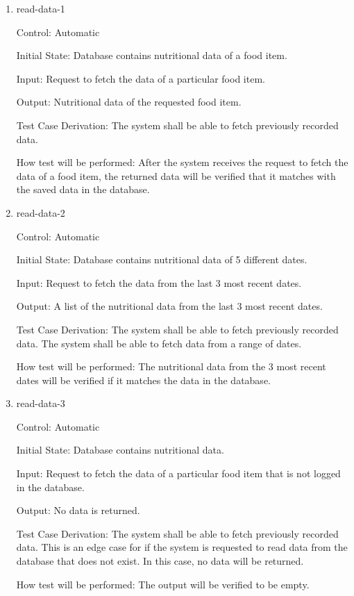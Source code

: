 \documentclass[12pt, titlepage]{article}
\begin{document}
	\begin{enumerate}
		
		\item{read-data-1\\}
		
		Control: Automatic
		
		Initial State: Database contains nutritional data of a food item.
		
		Input: Request to fetch the data of a particular food item.
		
		Output: Nutritional data of the requested food item.
		
		Test Case Derivation: The system shall be able to fetch previously recorded data.
		
		How test will be performed: After the system receives the request to fetch the data of a food item, the returned data will be verified that it matches with the saved data in the database.
		
		\item{read-data-2\\}
		
		Control: Automatic
		
		Initial State: Database contains nutritional data of 5 different dates.
		
		Input: Request to fetch the data from the last 3 most recent dates.
		
		Output: A list of the nutritional data from the last 3 most recent dates.
		
		Test Case Derivation: The system shall be able to fetch previously recorded data. The system shall be able to fetch data from a range of dates.
		
		How test will be performed: The nutritional data from the 3 most recent dates will be verified if it matches the data in the database.
		
		\item{read-data-3\\}
		
		Control: Automatic
		
		Initial State: Database contains nutritional data.
		
		Input: Request to fetch the data of a particular food item that is not logged in the database.
		
		Output: No data is returned.
		
		Test Case Derivation: The system shall be able to fetch previously recorded data. This is an edge case for if the system is requested to read data from the database that does not exist. In this case, no data will be returned.
		
		How test will be performed: The output will be verified to be empty.
		
	\end{enumerate}
	
\end{document}
